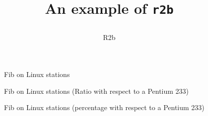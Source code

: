 \documentclass[11pt]{article}
\begin{document}
\title{An example of \texttt{r2b}
\author{R2b}}
\maketitle

\begin{figure}[h]
\begin{center}
\begin{small}
\epsfxsize=10cm
\end{small}
\end{center}
\caption{Fib on Linux stations}
\end{figure}

\begin{figure}[h]
\begin{center}
\begin{small}
\epsfxsize=10cm
\end{small}
\end{center}
\caption{Fib on Linux stations (Ratio with respect to a Pentium 233)}
\end{figure}

\begin{figure}[h]
\begin{center}
\begin{small}
\epsfxsize=10cm
\end{small}
\end{center}
\caption{Fib on Linux stations (percentage with respect to a Pentium 233)}
\end{figure}
\end{document}
